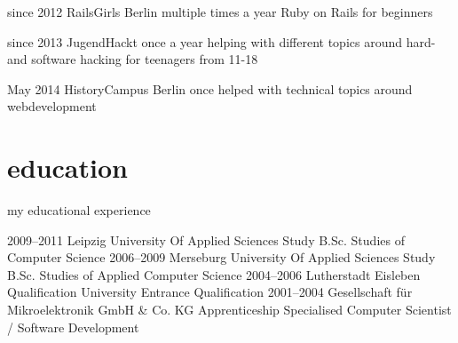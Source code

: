 \documentclass[]{friggeri-cv}
\begin{document}
\begin{entrylist}
  \entry
    {since 2012}
    {RailsGirls Berlin}
    {multiple times a year}
    {Ruby on Rails for beginners}

  \entry
    {since 2013}
    {JugendHackt}
    {once a year}
    {helping with different topics around hard- and software hacking for teenagers from 11-18}

  \entry
    {May 2014}
    {HistoryCampus Berlin}
    {once}
    {helped with technical topics around webdevelopment}

\end{entrylist}


\pagebreak
\section{education}
my educational experience

\begin{entrylist}
  \entry
    {2009–2011}
    {Leipzig University Of Applied Sciences}
    {Study B.Sc.}
    {Studies of Computer Science}
  \entry
    {2006–2009}
    {Merseburg University Of Applied Sciences}
    {Study B.Sc.}
    {Studies of Applied Computer Science}
  \entry
    {2004–2006}
    {Lutherstadt Eisleben}
    {Qualification}
    {University Entrance Qualification}
  \entry
    {2001–2004}
    {Gesellschaft für Mikroelektronik GmbH \& Co. KG}
    {Apprenticeship}
    {Specialised Computer Scientist / Software Development}
\end{entrylist}


%
\end{document}

